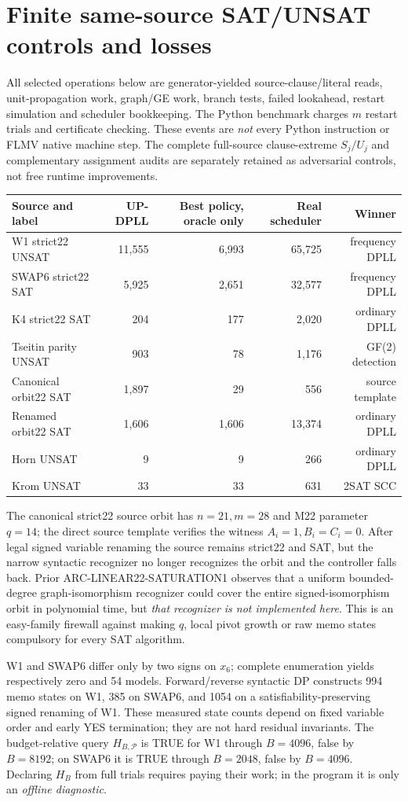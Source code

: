 \documentclass[10pt]{article}
\begin{document}
\section{Finite same-source SAT/UNSAT controls and losses}
All selected operations below are generator-yielded source-clause/literal reads, unit-propagation work, graph/GE work, branch tests, failed lookahead, restart simulation and scheduler bookkeeping. The Python benchmark charges $m$ restart trials and certificate checking. These events are \emph{not} every Python instruction or FLMV native machine step. The complete full-source clause-extreme $S_j/U_j$ and complementary assignment audits are separately retained as adversarial controls, not free runtime improvements.
\begin{center}\small
\begin{tabular}{lrrrr}
\toprule Source and label&UP-DPLL&Best policy, oracle only&Real scheduler&Winner\\\midrule
W1 strict22 UNSAT&11,555&6,993&65,725&frequency DPLL\\
SWAP6 strict22 SAT&5,925&2,651&32,577&frequency DPLL\\
K4 strict22 SAT&204&177&2,020&ordinary DPLL\\
Tseitin parity UNSAT&903&78&1,176&GF(2) detection\\
Canonical orbit22 SAT&1,897&29&556&source template\\
Renamed orbit22 SAT&1,606&1,606&13,374&ordinary DPLL\\
Horn UNSAT&9&9&266&ordinary DPLL\\
Krom UNSAT&33&33&631&2SAT SCC\\\bottomrule
\end{tabular}
\end{center}
The canonical strict22 source orbit has $n=21,m=28$ and M22 parameter $q=14$; the direct source template verifies the witness $A_i=1,B_i=C_i=0$. After legal signed variable renaming the source remains strict22 and SAT, but the narrow syntactic recognizer no longer recognizes the orbit and the controller falls back. Prior ARC-LINEAR22-SATURATION1 observes that a uniform bounded-degree graph-isomorphism recognizer could cover the entire signed-isomorphism orbit in polynomial time, but \emph{that recognizer is not implemented here}. This is an easy-family firewall against making $q$, local pivot growth or raw memo states compulsory for every SAT algorithm.

W1 and SWAP6 differ only by two signs on $x_6$; complete enumeration yields respectively zero and 54 models. Forward/reverse syntactic DP constructs 994 memo states on W1, 385 on SWAP6, and 1054 on a satisfiability-preserving signed renaming of W1. These measured state counts depend on fixed variable order and early YES termination; they are not hard residual invariants. The budget-relative query $H_{B,\mathcal P}$ is TRUE for W1 through $B=4096$, false by $B=8192$; on SWAP6 it is TRUE through $B=2048$, false by $B=4096$. Declaring $H_B$ from full trials requires paying their work; in the program it is only an \emph{offline diagnostic}.
\end{document}
